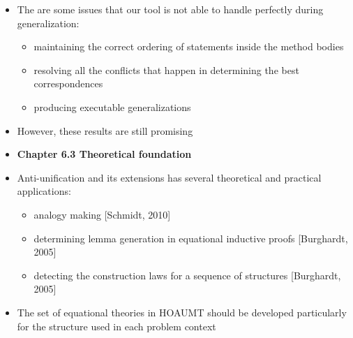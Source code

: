 \documentclass{article}
\newcommand{\bold}{\textbf}
\begin{document}
\begin{itemize} [leftmargin=.1in]
\item The are some issues that our tool is not able to handle perfectly during generalization:
\begin{itemize} 
\item maintaining the correct ordering of statements inside the method bodies
\item resolving all the conflicts that happen in determining the best correspondences
\item producing executable generalizations
\end{itemize}
\item However, these results are still promising

\item \bold{Chapter 6.3 Theoretical foundation}
\item Anti-unification and its extensions has several theoretical and practical applications: 
\begin{itemize}
\item analogy making [Schmidt, 2010]
\item determining lemma generation in equational inductive proofs [Burghardt, 2005]
\item detecting the construction laws for a sequence of structures [Burghardt, 2005]
\end{itemize}
\item The set of equational theories in HOAUMT should be developed particularly for the structure used in each problem context 


\end{itemize}
\end{document}
